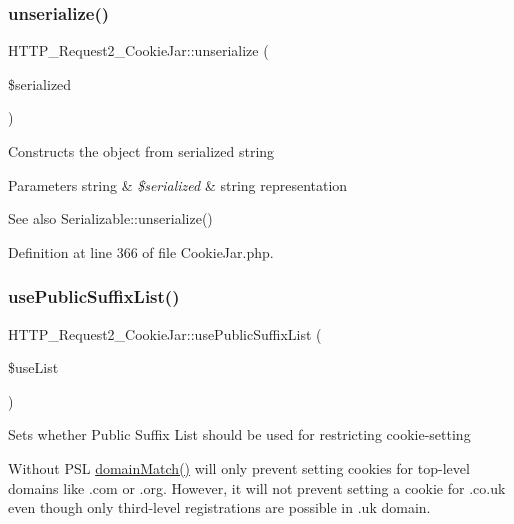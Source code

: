 \subsubsection{\texorpdfstring{unserialize()}{unserialize()}}
{\footnotesize\ttfamily H\+T\+T\+P\+\_\+\+Request2\+\_\+\+Cookie\+Jar\+::unserialize (\begin{DoxyParamCaption}\item[{}]{\$serialized }\end{DoxyParamCaption})}

Constructs the object from serialized string


\begin{DoxyParams}[1]{Parameters}
string & {\em \$serialized} & string representation\\
\hline
\end{DoxyParams}
\begin{DoxySeeAlso}{See also}
Serializable\+::unserialize() 
\end{DoxySeeAlso}


Definition at line 366 of file Cookie\+Jar.\+php.

\hypertarget{classHTTP__Request2__CookieJar_aa5754da6e9d23db800e091bc16fb3bc8}{}\label{classHTTP__Request2__CookieJar_aa5754da6e9d23db800e091bc16fb3bc8} 
\subsubsection{\texorpdfstring{use\+Public\+Suffix\+List()}{usePublicSuffixList()}}
{\footnotesize\ttfamily H\+T\+T\+P\+\_\+\+Request2\+\_\+\+Cookie\+Jar\+::use\+Public\+Suffix\+List (\begin{DoxyParamCaption}\item[{}]{\$use\+List }\end{DoxyParamCaption})}

Sets whether Public Suffix List should be used for restricting cookie-\/setting

Without P\+SL \hyperlink{classHTTP__Request2__CookieJar_ad22bee9ce6d2c111120bf44c3e302401}{domain\+Match()} will only prevent setting cookies for top-\/level domains like \textquotesingle{}.com\textquotesingle{} or \textquotesingle{}.org\textquotesingle{}. However, it will not prevent setting a cookie for \textquotesingle{}.co.\+uk\textquotesingle{} even though only third-\/level registrations are possible in .uk domain.

